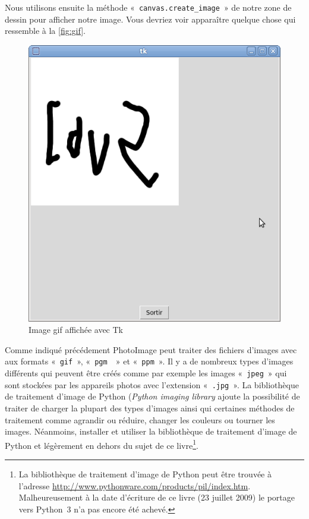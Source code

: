 Nous utilisons ensuite la méthode « \texttt{canvas.create\_image} » de notre zone de dessin pour afficher notre image. Vous devriez voir apparaître quelque chose qui ressemble à la \autoref{fig:gif}. 
\begin{figure}[h!]
\centering
\includegraphics[scale=0.4]{images/gif}
\caption{Image gif affichée avec Tk}\label{fig:gif}
\end{figure}


Comme indiqué précédement PhotoImage peut traiter des fichiers d'images avec aux formats « \texttt{gif} », « \texttt{pgm } » et « \texttt{ppm} ».
Il y a de nombreux types d'images différents qui peuvent être créés comme par exemple les images « \texttt{jpeg} » qui sont stockées par les appareils photos avec l'extension « \texttt{.jpg} ». 
La bibliothèque de traitement d'image de Python (\emph{Python imaging library} ajoute la possibilité de traiter de charger la plupart des types d'images ainsi qui certaines méthodes de traitement comme agrandir ou réduire, changer les couleurs ou tourner les images.  Néanmoins, installer et utiliser la bibliothèque de traitement d'image de Python et légèrement en dehors du sujet de ce livre\footnote{La  bibliothèque de traitement d'image de Python peut être trouvée à l'adresse \url{http://www.pythonware.com/products/pil/index.htm}. Malheureusement à la date d'écriture de ce livre (23 juillet 2009) le portage vers Python 3 n'a pas encore été achevé.}. 

